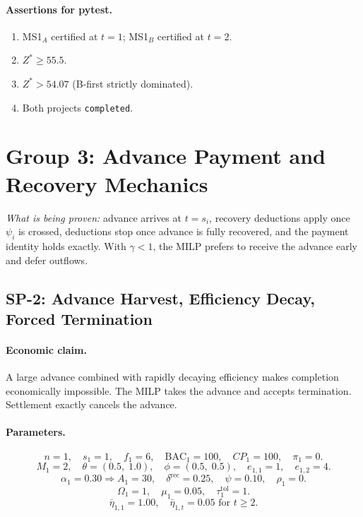 \documentclass[11pt, a4paper]{article}
\newcommand{\BAC}{\mathrm{BAC}}
\begin{document}
\paragraph{Assertions for pytest.}
\begin{enumerate}[label=A\arabic*.]
  \item MS1$_A$ certified at $t=1$; MS1$_B$ certified at $t=2$.
  \item $Z^*\geq55.5$.
  \item $Z^*>54.07$ (B-first strictly dominated).
  \item Both projects \texttt{completed}.
\end{enumerate}

\section{Group 3: Advance Payment and Recovery Mechanics}

\textit{What is being proven:} advance arrives at $t=s_i$, recovery
deductions apply once $\psi_i$ is crossed, deductions stop once advance
is fully recovered, and the payment identity holds exactly. With
$\gamma<1$, the MILP prefers to receive the advance early and defer
outflows.

\subsection{SP-2: Advance Harvest, Efficiency Decay, Forced Termination}

\paragraph{Economic claim.}
A large advance combined with rapidly decaying efficiency makes
completion economically impossible. The MILP takes the advance and
accepts termination. Settlement exactly cancels the advance.

\paragraph{Parameters.}
\[
  n=1,\quad s_1=1,\quad f_1=6,\quad\BAC_1=100,\quad CP_1=100,\quad\pi_1=0.
\]
\[
  M_1=2,\quad\theta=(0.5,\;1.0),\quad\phi=(0.5,\;0.5),\quad
  e_{1,1}=1,\quad e_{1,2}=4.
\]
\[
  \alpha_1=0.30\Rightarrow A_1=30,\quad\delta^{\mathrm{rec}}=0.25,\quad
  \psi=0.10,\quad\rho_1=0.
\]
\[
  \Omega_1=1,\quad\mu_1=0.05,\quad\tau_1^{\mathrm{tol}}=1.
\]
\[
  \bar\eta_{1,1}=1.00,\quad\bar\eta_{1,t}=0.05\text{ for }t\geq2.
\]
\end{document}
